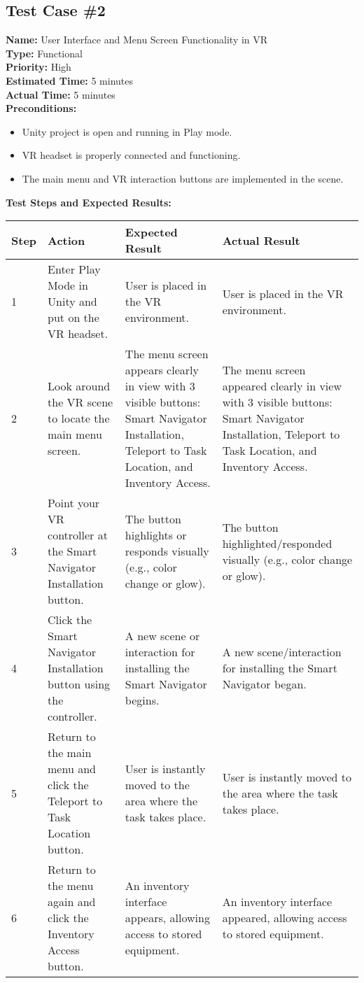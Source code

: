 \documentclass[11pt]{article}
\begin{document}
\subsection{Test Case \#2}
\textbf{Name:} User Interface and Menu Screen Functionality in VR \\
\textbf{Type:} Functional \\
\textbf{Priority:} High \\
\textbf{Estimated Time:} 5 minutes \\
\textbf{Actual Time:} 5 minutes \\
\textbf{Preconditions:} 
\begin{itemize}
\item Unity project is open and running in Play mode.
\item VR headset is properly connected and functioning.
\item The main menu and VR interaction buttons are implemented in the scene.
\end{itemize}
\textbf{Test Steps and Expected Results:} \\
\begin{tabular}{@{} p{0.8cm} p{4.6cm} p{4.6cm} p{4.6cm} @{}}
\toprule
\textbf{Step} & \textbf{Action} & \textbf{Expected Result} & \textbf{Actual Result} \\
\midrule
1 & Enter Play Mode in Unity and put on the VR headset. & User is placed in the VR environment. & User is placed in the VR environment. \\
2 & Look around the VR scene to locate the main menu screen. & The menu screen appears clearly in view with 3 visible buttons: Smart Navigator Installation, Teleport to Task Location, and Inventory Access. & The menu screen appeared clearly in view with 3 visible buttons: Smart Navigator Installation, Teleport to Task Location, and Inventory Access. \\
3 & Point your VR controller at the Smart Navigator Installation button. & The button highlights or responds visually (e.g., color change or glow). & The button highlighted/responded visually (e.g., color change or glow). \\
4 & Click the Smart Navigator Installation button using the controller. & A new scene or interaction for installing the Smart Navigator begins. & A new scene/interaction for installing the Smart Navigator began. \\
5 & Return to the main menu and click the Teleport to Task Location button. & User is instantly moved to the area where the task takes place. & User is instantly moved to the area where the task takes place. \\
6 & Return to the menu again and click the Inventory Access button. & An inventory interface appears, allowing access to stored equipment. & An inventory interface appeared, allowing access to stored equipment. \\
\bottomrule
\end{tabular}
\end{document}
